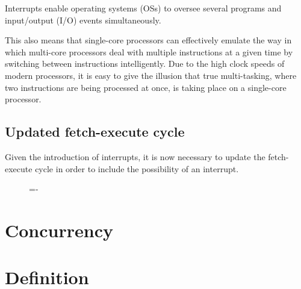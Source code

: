 \documentclass[a4paper]{systems-software}
\begin{document}
Interrupts enable operating systems (OSs) to oversee several programs and input/output (I/O) events simultaneously.

This also means that single-core processors can effectively emulate the way in which multi-core processors deal with multiple instructions at a given time by switching between instructions intelligently. Due to the high clock speeds of modern processors, it is easy to give the illusion that true multi-tasking, where two instructions are being processed at once, is taking place on a single-core processor.


\subsection*{Updated fetch-execute cycle}

Given the introduction of interrupts, it is now necessary to update the fetch-execute cycle in order to include the possibility of an interrupt.

\begin{figure}[H]
  \lineskip=-\fboxrule
\end{figure}


\section{Concurrency}

\section*{Definition}
\end{document}
